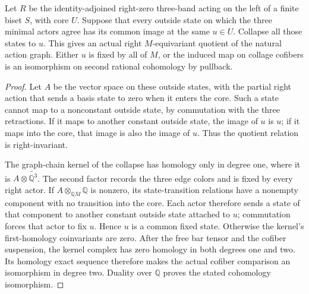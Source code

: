 \begin{lemma}
\label{C:right-zero-constant-star-removal}
Let $R$ be the identity-adjoined right-zero three-band acting
on the left of a finite biset $S$, with core $U$.
Suppose that every outside state on which the three minimal
actors agree has its common image at the same $u\in U$.
Collapse all those states to $u$. This gives an actual right
$M$-equivariant quotient of the natural action graph.
Either $u$ is fixed by all of $M$, or the induced map on
collage cofibers is an isomorphism on second rational
cohomology by pullback.
\end{lemma}
\begin{proof}
Let $A$ be the vector space on these outside states, with
the partial right action that sends a basis state to zero
when it enters the core. Such a state cannot map to a
nonconstant outside state, by commutation with the three
retractions. If it maps to another constant outside state,
the image of $u$ is $u$; if it maps into the core, that
image is also the image of $u$. Thus the quotient relation
is right-invariant.

The graph-chain kernel of the collapse has homology only
in degree one, where it is $A\otimes\widetilde{\mathbb Q^3}$.
The second factor records the three edge colors and is
fixed by every right actor. If $A\otimes_{\mathbb QM}\mathbb Q$
is nonzero, its state-transition relations have a nonempty
component with no transition into the core. Each actor
therefore sends a state of that component to another
constant outside state attached to $u$; commutation forces
that actor to fix $u$. Hence $u$ is a common fixed state.
Otherwise the kernel's first-homology coinvariants are zero.
After the free bar tensor and the cofiber suspension, the
kernel complex has zero homology in both degrees one and
two. Its homology exact sequence therefore makes the actual
cofiber comparison an isomorphism in degree two. Duality
over $\mathbb Q$ proves the stated cohomology isomorphism.
\end{proof}

